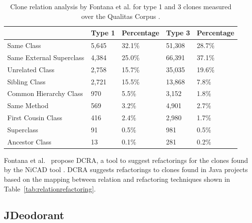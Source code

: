 \begin{table}[H]
\centering
\begin{tabular}{@{}lllll@{}}
\toprule
                         & Type 1 & Percentage & Type 3 & Percentage \\ \midrule
Same Class               & 5,645  & 32.1\%     & 51,308 & 28.7\%     \\
Same External Superclass & 4,384  & 25.0\%     & 66,391 & 37.1\%     \\
Unrelated Class          & 2,758  & 15.7\%     & 35,035 & 19.6\%     \\
Sibling Class            & 2,721  & 15.5\%     & 13,868 & 7.8\%      \\
Common Hierarchy Class   & 970    & 5.5\%      & 3,152  & 1.8\%      \\
Same Method              & 569    & 3.2\%      & 4,901  & 2.7\%      \\
First Cousin Class       & 416    & 2.4\%      & 2,980  & 1.7\%      \\
Superclass               & 91     & 0.5\%      & 981    & 0.5\%      \\
Ancestor Class           & 13     & 0.1\%      & 281    & 0.2\%      \\ \bottomrule
\end{tabular}
\caption{Clone relation analysis by Fontana et al. \cite{fontana2012duplicated} for type 1 and 3 clones measured over the Qualitas Corpus \cite{tempero2010qualitas}.}
\label{tab:dcra-relation}
\end{table}

Fontana et al.~\cite{fontana2012duplicated, fontana2015duplicated} propose DCRA, a tool to suggest refactorings for the clones found by the NiCAD tool \cite{roy2008nicad, cordy2011nicad}. DCRA suggests refactorings to clones found in Java projects based on the mapping between relation and refactoring techniques shown in Table~\ref{tab:relationrefactoring}.

\subsection{JDeodorant}
\cite{krishnan2013refactoring, krishnan2014unification, tsantalis2015assessing, mazinanian2016jdeodorant, tsantalis2017clone}

